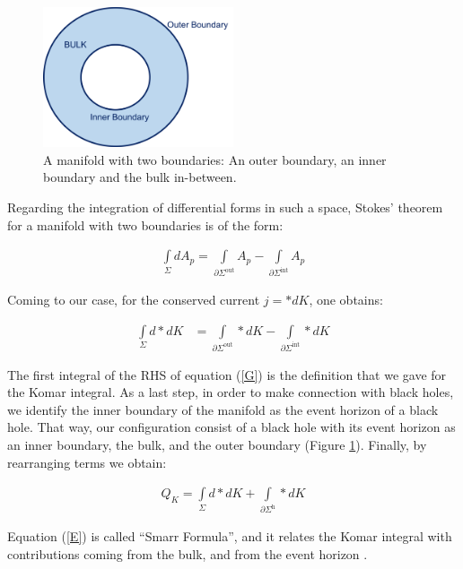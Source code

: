 \documentclass[a4paper,notitlepage]{report}
\begin{document}
\begin{figure}[ht]
\centering
\includegraphics [width=0.5\textwidth]{Smarr}
\caption{A manifold with two boundaries: An outer boundary, an inner boundary and the bulk in-between.}
\label{Smarr}
\end{figure}

Regarding the integration of differential forms in such a space, Stokes' theorem for a manifold with two boundaries is of the form:

\begin{align}
\int\limits_{\Sigma} d A_{p} = \int\limits_{\partial \Sigma^{\text{out}}} A_{p} - \int\limits_{\partial \Sigma^{\text{int}}} A_{p}
\end{align}

\vspace{0.5 em}
Coming to our case, for the conserved current $j=*dK$, one obtains:

\begin{align} \label{G}
\int\limits_{\Sigma} d *dK &= \int\limits_{\partial \Sigma^{\text{out}}} *dK - \int\limits_{\partial \Sigma^{\text{int}}} *dK  
\end{align}

\vspace{0.5 em}
The first integral of the RHS of equation (\ref{G}) is the definition that we gave for the Komar integral. As a last step, in order to make connection with black holes, we identify the inner boundary of the manifold as the event horizon of a black hole. That way, our configuration consist of a black hole with its event horizon as an inner boundary, the bulk, and the outer boundary (Figure \ref{Smarr}). Finally, by rearranging terms we obtain:

\begin{align} \label{E}
Q_{K} = \int\limits_{\Sigma} d *dK + \int\limits_{\partial \Sigma^{\text{h}}} *dK
\end{align}

\vspace{0.5 em}
Equation (\ref{E}) is called ``Smarr Formula'', and it relates the Komar integral with contributions coming from the bulk, and from the event horizon \cite{smarr1973mass}. 
\end{document}
